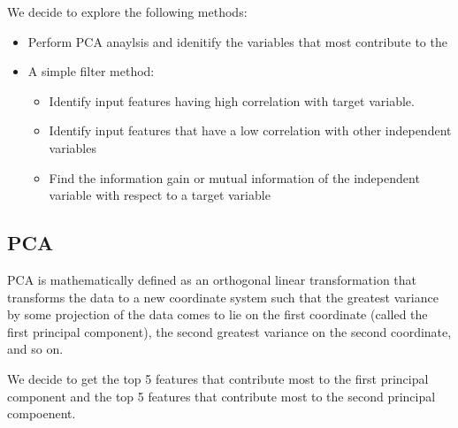 \documentclass[letterpaper,10pt,english]{jupyterBook}
\begin{document}
\sphinxAtStartPar
We decide to explore the following methods:
\begin{itemize}
\item {} 
\sphinxAtStartPar
Perform PCA anaylsis and idenitify the variables that most contribute to the

\item {} 
\sphinxAtStartPar
A simple filter method:
\begin{itemize}
\item {} 
\sphinxAtStartPar
Identify input features having high correlation with target variable.

\item {} 
\sphinxAtStartPar
Identify input features that have a low correlation with other independent variables

\item {} 
\sphinxAtStartPar
Find the information gain or mutual information of the independent variable with respect to a target variable

\end{itemize}

\end{itemize}


\subsection{PCA}
\label{\detokenize{Model_evaluation:pca}}
\sphinxAtStartPar
PCA is mathematically defined as an orthogonal linear transformation that transforms the data to a new coordinate system such that the greatest variance by some projection of the data comes to lie on the first coordinate (called the first principal component), the second greatest variance on the second coordinate, and so on.

\sphinxAtStartPar
We decide to get the top 5 features that contribute most to the first principal component and the top 5 features that contribute most to the second principal compoenent.
\end{document}
